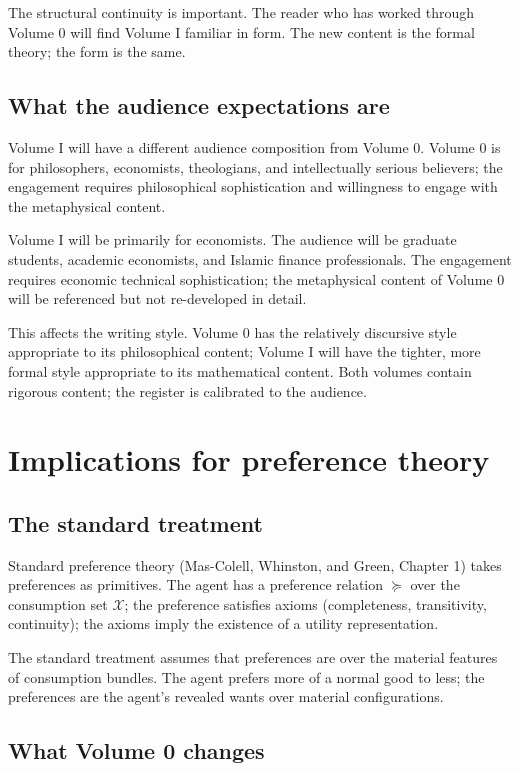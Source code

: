 The structural continuity is important. The reader who has
worked through Volume 0 will find Volume I familiar in form. The
new content is the formal theory; the form is the same.

\subsection{What the audience expectations are}

Volume I will have a different audience composition from Volume 0.
Volume 0 is for philosophers, economists, theologians, and
intellectually serious believers; the engagement requires
philosophical sophistication and willingness to engage with the
metaphysical content.

Volume I will be primarily for economists. The audience will be
graduate students, academic economists, and Islamic finance
professionals. The engagement requires economic technical
sophistication; the metaphysical content of Volume 0 will be
referenced but not re-developed in detail.

This affects the writing style. Volume 0 has the relatively
discursive style appropriate to its philosophical content; Volume
I will have the tighter, more formal style appropriate to its
mathematical content. Both volumes contain rigorous content; the
register is calibrated to the audience.

\section{Implications for preference theory}
\label{sec:to-vol1-preferences}

\subsection{The standard treatment}

Standard preference theory (Mas-Colell, Whinston, and Green,
Chapter 1) takes preferences as primitives. The agent has a
preference relation $\succeq$ over the consumption set
$\mathcal{X}$; the preference satisfies axioms (completeness,
transitivity, continuity); the axioms imply the existence of a
utility representation.

The standard treatment assumes that preferences are over the
material features of consumption bundles. The agent prefers more
of a normal good to less; the preferences are the agent's
revealed wants over material configurations.

\subsection{What Volume 0 changes}

